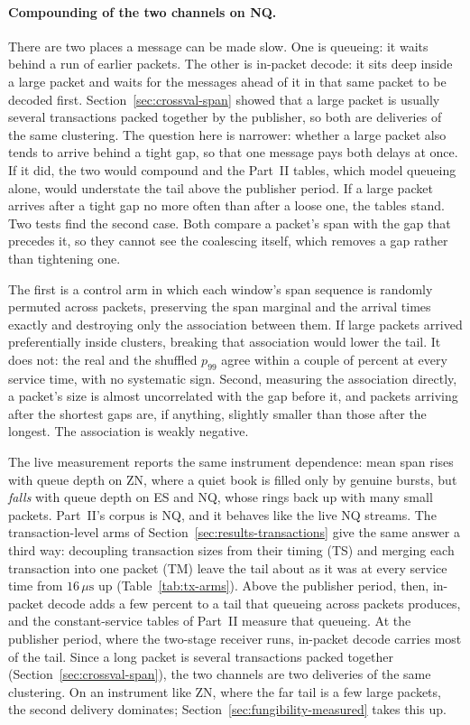 \documentclass[11pt]{article}
\begin{document}
\paragraph{Compounding of the two channels on NQ.} There are two places
a message can be made slow. One is queueing: it waits behind a run of earlier packets.
The other is in-packet decode: it sits deep inside a large packet and waits for the
messages ahead of it in that same packet to be decoded first. Section~\ref{sec:crossval-span}
showed that a large packet is usually several transactions packed together by the publisher, so
both are deliveries of the same clustering. The question here is narrower: whether a
large packet also tends to arrive behind a tight gap, so that one message pays both
delays at once. If it did, the two would compound and the Part~II tables, which model
queueing alone, would understate the tail above the publisher period. If a large packet arrives
after a tight gap no more often than after a loose one, the tables stand. Two tests find
the second case. Both compare a packet's span with the gap that precedes it, so they
cannot see the coalescing itself, which removes a gap rather than tightening one.

The first is a control arm in which each window's span sequence is randomly permuted
across packets, preserving the span marginal and the arrival times exactly and destroying
only the association between them. If large packets arrived preferentially inside
clusters, breaking that association would lower the tail. It does not: the real and the
shuffled $p_{99}$ agree within a couple of percent at every service time, with no
systematic sign. Second, measuring the association directly, a packet's size is almost
uncorrelated with the gap before it, and packets arriving after the shortest gaps are, if
anything, slightly smaller than those after the longest. The association is weakly
negative.

The live measurement reports the same instrument dependence: mean span rises with queue
depth on ZN, where a quiet book is filled
only by genuine bursts, but \emph{falls} with queue depth on ES and NQ, whose rings back up
with many small packets. Part~II's corpus is NQ, and it behaves like the live NQ streams.
The transaction-level arms of Section~\ref{sec:results-transactions} give the same
answer a third way: decoupling transaction sizes from their timing (TS) and merging each
transaction into one packet (TM) leave the tail about as it was at every service time from $16\,\mu\mathrm{s}$ up (Table~\ref{tab:tx-arms}). Above the publisher period, then, in-packet decode adds a few percent to a tail that
queueing across packets produces, and the constant-service tables of Part~II measure that
queueing. At the publisher period, where the two-stage receiver runs, in-packet decode
carries most of the tail. Since a long packet is several transactions packed together
(Section~\ref{sec:crossval-span}), the two channels are two deliveries of the same
clustering. On an instrument like ZN, where the far tail is a few
large packets, the second delivery dominates; Section~\ref{sec:fungibility-measured}
takes this up.
\end{document}
